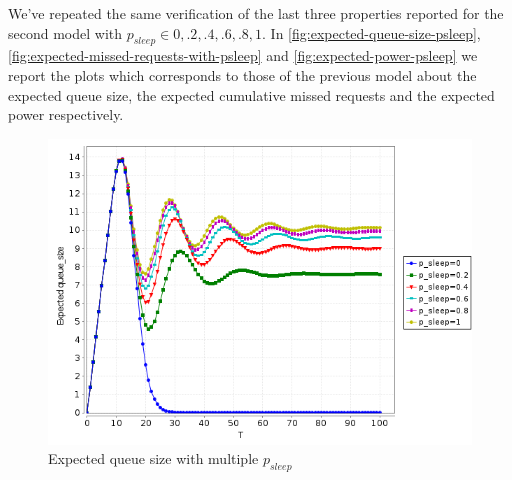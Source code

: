 We've repeated the same verification of the last three properties
reported for the second model with $p_{sleep} \in {0, .2, .4, .6, .8,
  1}$. In \autoref{fig:expected-queue-size-psleep},
\autoref{fig:expected-missed-requests-with-psleep} and
\autoref{fig:expected-power-psleep} we report the plots which
corresponds to those of the previous model about the expected queue
size, the expected cumulative missed requests and the expected power
respectively.
\begin{figure}[htb]
  \centering
  \includegraphics[width=13cm]{quantitative-project/expected-queue-size-with-psleep.png}
  \caption{Expected queue size with multiple $p_{sleep}$}
  \label{fig:expected-queue-size-psleep}
\end{figure}


